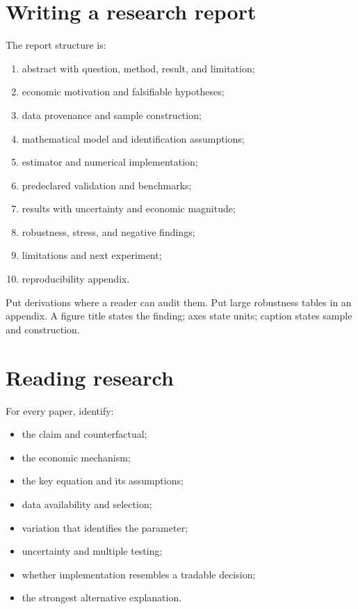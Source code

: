 \section{Writing a research report}

The report structure is:

\begin{enumerate}
\item abstract with question, method, result, and limitation;
\item economic motivation and falsifiable hypotheses;
\item data provenance and sample construction;
\item mathematical model and identification assumptions;
\item estimator and numerical implementation;
\item predeclared validation and benchmarks;
\item results with uncertainty and economic magnitude;
\item robustness, stress, and negative findings;
\item limitations and next experiment;
\item reproducibility appendix.
\end{enumerate}

Put derivations where a reader can audit them. Put large robustness tables in an
appendix. A figure title states the finding; axes state units; caption states sample
and construction.

\section{Reading research}

For every paper, identify:

\begin{itemize}
\item the claim and counterfactual;
\item the economic mechanism;
\item the key equation and its assumptions;
\item data availability and selection;
\item variation that identifies the parameter;
\item uncertainty and multiple testing;
\item whether implementation resembles a tradable decision;
\item the strongest alternative explanation.
\end{itemize}

